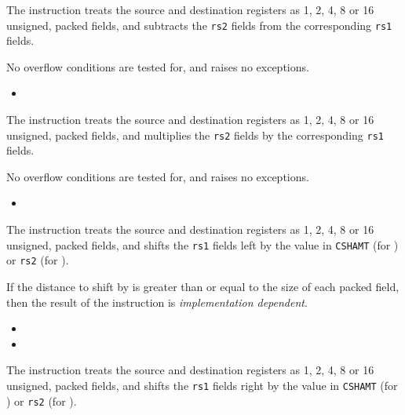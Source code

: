 \ienc{\iencsubpx}

The instruction  treats the source and destination registers as
1, 2, 4, 8 or 16 unsigned, packed fields, and subtracts the {\tt rs2} fields
from the corresponding {\tt rs1} fields.

No overflow conditions are tested for, and  raises no exceptions.

\begin{itemize}
\item {}
\end{itemize}

\ienc{\iencmulpx}

The instruction  treats the source and destination registers as
1, 2, 4, 8 or 16 unsigned, packed fields, and multiplies the {\tt rs2} fields
by the corresponding {\tt rs1} fields.

No overflow conditions are tested for, and  raises no exceptions.

\begin{itemize}
\item {}
\end{itemize}

\ienc{\iencsllpx\iencsllipx}

The instruction  treats the source and destination registers as
1, 2, 4, 8 or 16 unsigned, packed fields, and shifts the {\tt rs1} fields
left by the value in {\tt CSHAMT} (for ) or {\tt rs2} 
(for ).

If the distance to shift by is greater than or equal to the size of each
packed field, then the result of the  instruction is
{\em implementation dependent}.

\begin{itemize}
\item {}
\item {}
\end{itemize}

\ienc{\iencsrlpx\iencsrlipx}

The instruction  treats the source and destination registers as
1, 2, 4, 8 or 16 unsigned, packed fields, and shifts the {\tt rs1} fields
right by the value in {\tt CSHAMT} (for ) or {\tt rs2} 
(for ).

